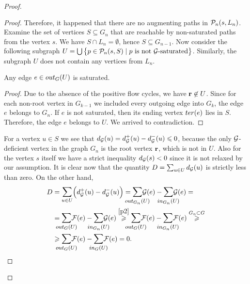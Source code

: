 \documentclass[12pt,oneside,a4paper]{amsart}
\begin{document}
\begin{proof}
\begin{proof}
          Therefore, it happened that there are no augmenting paths in $\gnpaths(s, L_n)$.
          Examine the set of vertices $S \subseteq G_n$ that are reachable by non-saturated paths from the vertex $s$.
          We have $S \cap L_n = \emptyset$, hence $S \subseteq G_{n-1}$.
          Now consider the following subgraph $U = \bigcup\big\{p \in \gnpaths(s, S) \mid \text{$p$ is not $\cal{G}$-saturated}\big\}$.
          Similarly, the subgraph $U$ does not contain any vertices from $L_n$.
          \begin{lemma}
            Any edge $e \in \eout_G(U)$ is saturated.
          \end{lemma}
          \begin{proof}
            Due to the absence of the positive flow cycles, we have $\root \not \in U$.
            Since for each non-root vertex in $G_{k-1}$ we included every outgoing edge into $G_k$,
              the edge $e$ belongs to $G_n$.
            If $e$ is not saturated, then its ending vertex $\ter(e)$ lies in $S$.
            Therefore, the edge $e$ belongs to $U$.
            We arrived to contradiction.
          \end{proof}
          For a vertex $u \in S$ we see that $d_{\cal{G}}(u) = d^{+}_{\cal{G}}(u) - d^{-}_{\cal{G}}(u) \leq 0$, because
            the only $\cal{G}$-deficient vertex in the graph $G_n$ is the root vertex $\root$, which is not in $U$.
          Also for the vertex $s$ itself we have a strict inequality $d_{\cal{G}}(s) < 0$ since it is not relaxed by our assumption.
          It is clear now that the quantity $D = \sum_{u \in U} d_{\cal{G}}(u)$ is strictly less than zero.
          On the other hand,
          \[
            \begin{split}
              D &= \mathlarger\sum_{u \in U} \Big(d^{+}_{\cal{G}}(u) - d^{-}_{\cal{G}}(u)\Big)
              = \mathlarger{\smashoperator{\sum_{\eout_{G_n}(U)}}} \cal{G}(e) - \mathlarger{\smashoperator{\sum_{\ein_{G_n}(U)}}} \cal{G}(e) = \\
              &= \mathlarger{\smashoperator{\sum_{\eout_{G}(U)}}} \flowpos(e) - \mathlarger{\smashoperator{\sum_{\ein_{G_n}(U)}}} \cal{G}(e)
                \overset{\ref{p2}}{\geq} \mathlarger{\smashoperator{\sum_{\eout_G(U)}}} \flowpos(e) - \mathlarger{\smashoperator{\sum_{\ein_{G_n}(U)}}} \flowpos(e) 
                \overset{G_n \subset G} \geq \\
              &\geq \mathlarger{\smashoperator{\sum_{\eout_G(U)}}} \flowpos(e) - \mathlarger{\smashoperator{\sum_{\ein_{G}(U)}}} \flowpos(e) = 0.

\end{split}\]
\end{proof}
\end{proof}
\end{document}
